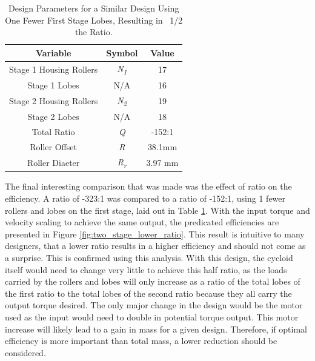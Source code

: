 \begin{table}[t]
  \vskip0.2cm
  \caption{Design Parameters for a Similar Design Using One Fewer First Stage Lobes, Resulting in ~1/2 the Ratio.}
  \label{table:two_stage_lower_ratio}
  \begin{center}
    \vskip-0.2cm
	\begin{tabular}{|c|c|c|}
		\hline
		Variable & Symbol & Value\\
		\hline
		Stage 1 Housing Rollers & \textit{N\textsubscript{1}} & 17\\
		\hline
		Stage 1 Lobes & N/A & 16\\
		\hline
		Stage 2 Housing Rollers & \textit{N\textsubscript{2}} & 19\\
		\hline
		Stage 2 Lobes & N/A & 18\\
		\hline
		Total Ratio & \textit{Q} & -152:1 \\
		\hline
		Roller Offset & \textit{R} & 38.1mm \\
		\hline
		Roller Diaeter & \textit{R\textsubscript{r}} & 3.97 mm\\
		\hline
	\end{tabular}
  \end{center}
\end{table}

The final interesting comparison that was made was the effect of ratio on the efficiency. A ratio of -323:1 was compared to a ratio of -152:1, using 1 fewer rollers and lobes on the first stage, laid out in Table \ref{table:two_stage_lower_ratio}. With the input torque and velocity scaling to achieve the same output, the predicated efficiencies are presented in Figure \ref{fig:two_stage_lower_ratio}. This result is intuitive to many designers, that a lower ratio results in a higher efficiency and should not come as a surprise. This is confirmed using this analysis. With this design, the cycloid itself would need to change very little to achieve this half ratio, as the loads carried by the rollers and lobes will only increase as a ratio of the total lobes of the first ratio to the total lobes of the second ratio because they all carry the output torque desired. The only major change in the design would be the motor used as the input would need to double in potential torque output. This motor increase will likely lead to a gain in mass for a given design. Therefore, if optimal efficiency is more important than total mass, a lower reduction should be considered. 

